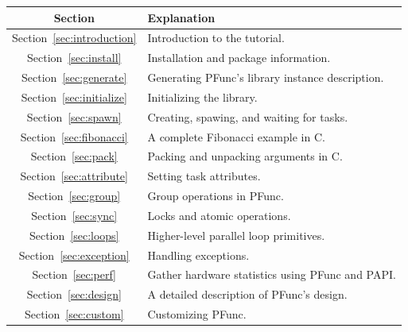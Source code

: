 \begin{center}
\begin{tabular}{|c|l|}
\hline
Section & Explanation \\
\hline
Section~\ref{sec:introduction} & Introduction to the tutorial.\\
\hline
Section~\ref{sec:install} & Installation and package information.\\
\hline
Section~\ref{sec:generate} & Generating PFunc's library instance description.\\
\hline
Section~\ref{sec:initialize} & Initializing the library.\\
\hline
Section~\ref{sec:spawn} & Creating, spawing, and waiting for tasks.\\
\hline
Section~\ref{sec:fibonacci} & A complete Fibonacci example in C. \\
\hline
Section~\ref{sec:pack} & Packing and unpacking arguments in C. \\
\hline
Section~\ref{sec:attribute} & Setting task attributes. \\
\hline
Section~\ref{sec:group} & Group operations in PFunc.\\
\hline
Section~\ref{sec:sync} & Locks and atomic operations.\\
\hline
Section~\ref{sec:loops} & Higher-level parallel loop primitives.\\
\hline
Section~\ref{sec:exception} & Handling exceptions.\\
\hline
Section~\ref{sec:perf} & Gather hardware statistics using PFunc and PAPI.\\
\hline
Section~\ref{sec:design} & A detailed description of PFunc's design.\\
\hline
Section~\ref{sec:custom} & Customizing PFunc. \\
\hline
\end{tabular}
\end{center}
